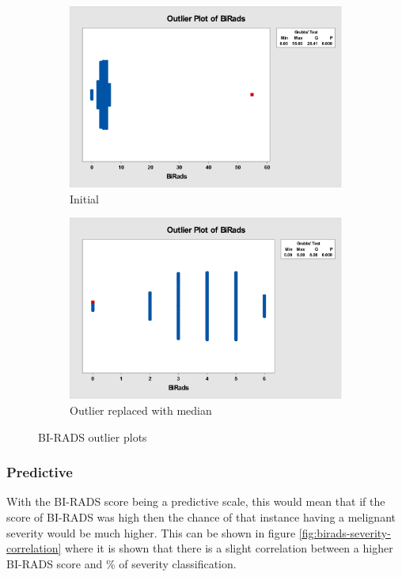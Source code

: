 \documentclass[12pt]{article}
\begin{document}
        \begin{figure}[H]
          \begin{subfigure}[b]{0.45\textwidth}
            \includegraphics[width=\textwidth]{birads-outlier-plot}
            \caption{Initial}
            \label{fig:birads-outlier}
          \end{subfigure}
          \hfill
          \begin{subfigure}[b]{0.45\textwidth}
            \includegraphics[width=\textwidth]{birads-outlier-plot-no55}
            \caption{Outlier replaced with median}
            \label{fig:birads-outilier-no55}
          \end{subfigure}
          \caption{BI-RADS outlier plots}
        \end{figure}

      \subsubsection{Predictive}
        With the BI-RADS score being a predictive scale, this would mean that if the score of BI-RADS was high then the chance of that instance having a melignant severity would be much higher. This can be shown in figure \ref{fig:birads-severity-correlation} where it is shown that there is a slight correlation between a higher BI-RADS score and \% of severity classification.
\end{document}
